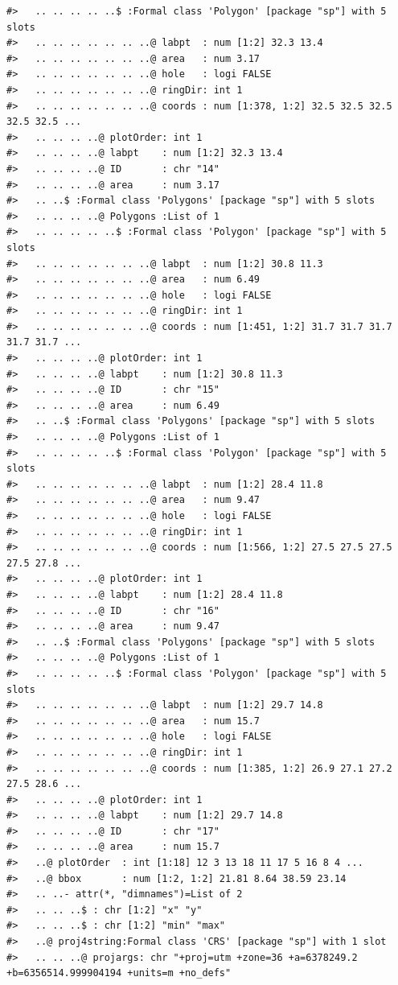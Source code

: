 \documentclass[12pt,a4paper,a4paper]{book}
\theoremstyle{definition}
\theoremstyle{definition}
\theoremstyle{definition}
\theoremstyle{remark}
\begin{document}
\begin{verbatim}
#>   .. .. .. .. ..$ :Formal class 'Polygon' [package "sp"] with 5 slots
#>   .. .. .. .. .. .. ..@ labpt  : num [1:2] 32.3 13.4
#>   .. .. .. .. .. .. ..@ area   : num 3.17
#>   .. .. .. .. .. .. ..@ hole   : logi FALSE
#>   .. .. .. .. .. .. ..@ ringDir: int 1
#>   .. .. .. .. .. .. ..@ coords : num [1:378, 1:2] 32.5 32.5 32.5 32.5 32.5 ...
#>   .. .. .. ..@ plotOrder: int 1
#>   .. .. .. ..@ labpt    : num [1:2] 32.3 13.4
#>   .. .. .. ..@ ID       : chr "14"
#>   .. .. .. ..@ area     : num 3.17
#>   .. ..$ :Formal class 'Polygons' [package "sp"] with 5 slots
#>   .. .. .. ..@ Polygons :List of 1
#>   .. .. .. .. ..$ :Formal class 'Polygon' [package "sp"] with 5 slots
#>   .. .. .. .. .. .. ..@ labpt  : num [1:2] 30.8 11.3
#>   .. .. .. .. .. .. ..@ area   : num 6.49
#>   .. .. .. .. .. .. ..@ hole   : logi FALSE
#>   .. .. .. .. .. .. ..@ ringDir: int 1
#>   .. .. .. .. .. .. ..@ coords : num [1:451, 1:2] 31.7 31.7 31.7 31.7 31.7 ...
#>   .. .. .. ..@ plotOrder: int 1
#>   .. .. .. ..@ labpt    : num [1:2] 30.8 11.3
#>   .. .. .. ..@ ID       : chr "15"
#>   .. .. .. ..@ area     : num 6.49
#>   .. ..$ :Formal class 'Polygons' [package "sp"] with 5 slots
#>   .. .. .. ..@ Polygons :List of 1
#>   .. .. .. .. ..$ :Formal class 'Polygon' [package "sp"] with 5 slots
#>   .. .. .. .. .. .. ..@ labpt  : num [1:2] 28.4 11.8
#>   .. .. .. .. .. .. ..@ area   : num 9.47
#>   .. .. .. .. .. .. ..@ hole   : logi FALSE
#>   .. .. .. .. .. .. ..@ ringDir: int 1
#>   .. .. .. .. .. .. ..@ coords : num [1:566, 1:2] 27.5 27.5 27.5 27.5 27.8 ...
#>   .. .. .. ..@ plotOrder: int 1
#>   .. .. .. ..@ labpt    : num [1:2] 28.4 11.8
#>   .. .. .. ..@ ID       : chr "16"
#>   .. .. .. ..@ area     : num 9.47
#>   .. ..$ :Formal class 'Polygons' [package "sp"] with 5 slots
#>   .. .. .. ..@ Polygons :List of 1
#>   .. .. .. .. ..$ :Formal class 'Polygon' [package "sp"] with 5 slots
#>   .. .. .. .. .. .. ..@ labpt  : num [1:2] 29.7 14.8
#>   .. .. .. .. .. .. ..@ area   : num 15.7
#>   .. .. .. .. .. .. ..@ hole   : logi FALSE
#>   .. .. .. .. .. .. ..@ ringDir: int 1
#>   .. .. .. .. .. .. ..@ coords : num [1:385, 1:2] 26.9 27.1 27.2 27.5 28.6 ...
#>   .. .. .. ..@ plotOrder: int 1
#>   .. .. .. ..@ labpt    : num [1:2] 29.7 14.8
#>   .. .. .. ..@ ID       : chr "17"
#>   .. .. .. ..@ area     : num 15.7
#>   ..@ plotOrder  : int [1:18] 12 3 13 18 11 17 5 16 8 4 ...
#>   ..@ bbox       : num [1:2, 1:2] 21.81 8.64 38.59 23.14
#>   .. ..- attr(*, "dimnames")=List of 2
#>   .. .. ..$ : chr [1:2] "x" "y"
#>   .. .. ..$ : chr [1:2] "min" "max"
#>   ..@ proj4string:Formal class 'CRS' [package "sp"] with 1 slot
#>   .. .. ..@ projargs: chr "+proj=utm +zone=36 +a=6378249.2 +b=6356514.999904194 +units=m +no_defs"
\end{verbatim}
\end{document}
